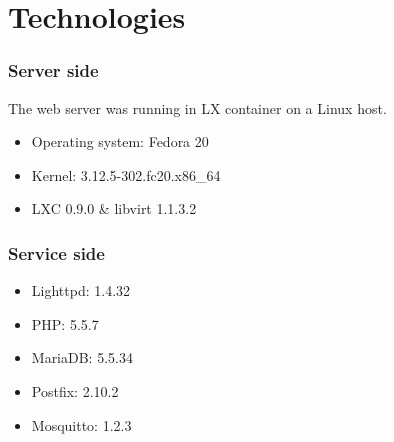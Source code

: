\section{Technologies}
%
\begin{frame}
\frametitle{Server side}
%
The web server was running in LX container on a Linux host.
%
\begin{itemize}
  \item Operating system: Fedora 20
  \item Kernel: 3.12.5-302.fc20.x86\_64
  \item LXC 0.9.0 \& libvirt 1.1.3.2
\end{itemize}
\end{frame}
%
\begin{frame}
\frametitle{Service side}
%
\begin{itemize}
  \item Lighttpd: 1.4.32
  \item PHP: 5.5.7
  \item MariaDB: 5.5.34
  \item Postfix: 2.10.2
  \item Mosquitto: 1.2.3
\end{itemize}
\end{frame}

